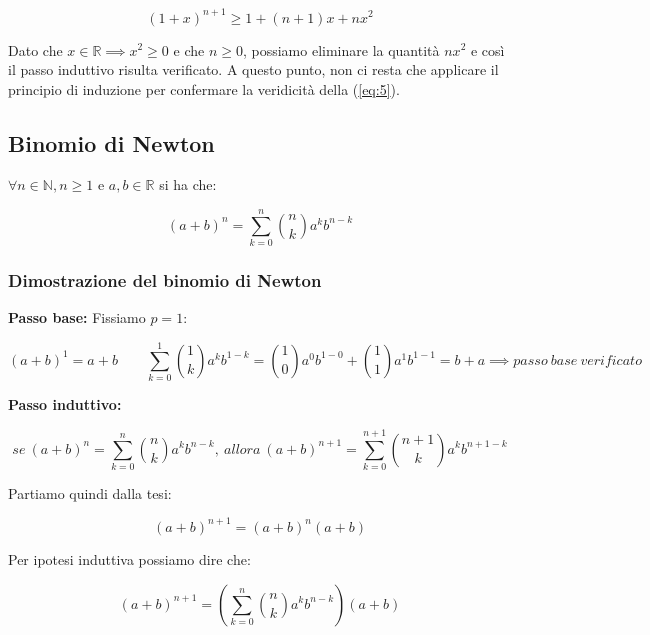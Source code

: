 \documentclass{article}
\begin{document}
\begin{equation*}
    (1+x)^{n+1} \geq 1 + (n + 1)x + nx^2
\end{equation*}

\noindent Dato che $x \in \mathbb{R} \implies x^2 \geq 0$ e che $n \geq 0$, possiamo eliminare la quantità $nx^2$ e così il passo induttivo risulta verificato. A questo punto, non ci resta che applicare il principio di induzione per confermare la veridicità della (\ref{eq:5}).

\subsection{Binomio di Newton}
$\forall n \in \mathbb{N}, n \geq 1$ e $a, b \in \mathbb{R}$ si ha che:

\begin{equation}
    (a + b)^n = \sum_{k=0}^n \binom{n}{k} a^k b^{n-k}
    \label{eq:6}
\end{equation}

\subsubsection{Dimostrazione del binomio di Newton}
\noindent\textbf{Passo base:} Fissiamo $p = 1$: 

\begin{equation*}
    (a + b)^1 = a + b \qquad \sum_{k=0}^1 \binom{1}{k}a^k b^{1-k}=\binom{1}{0}a^0b^{1-0} + \binom{1}{1}a^1b^{1-1} = b+a \implies passo \ base \ verificato
\end{equation*}

\noindent\textbf{Passo induttivo:} 

\begin{equation*}
    se \ (a + b)^n = \sum_{k=0}^n \binom{n}{k} a^k b^{n-k}, \ allora \ (a+b)^{n+1} = \sum_{k=0}^{n+1} \binom{n + 1}{k} a^{k}b^{n+1-k}
\end{equation*}

\noindent Partiamo quindi dalla tesi:

\begin{equation*}
    (a+b)^{n+1} = (a + b)^n (a + b)
\end{equation*}

\noindent Per ipotesi induttiva possiamo dire che:

\begin{equation*}
    (a+b)^{n+1} = \left(\sum_{k=0}^n \binom{n}{k} a^k b^{n-k}\right)(a+b)
\end{equation*}
\end{document}
